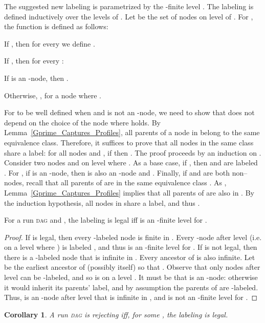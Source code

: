 \documentclass{LMCS}
\newcommand{\DAG}{\textsc{dag}\xspace}
\newtheorem{corollary}[theorem]{Corollary}
\begin{document}
The suggested new labeling is parametrized by the -finite level .  The labeling 
is defined inductively over the levels of .  Let  be the set of nodes on level  of .
For , the function  is defined as follows:
\begin{iteMize}{}
\item If , then for every  we define .
\item If , then for every :
\begin{iteMize}{}
\item If  is an -node, then .
\item Otherwise, , for a node  where . 
\end{iteMize}
\end{iteMize}
For  to be well defined when  and  is not an -node, we need to show that
 does not depend on the choice of the node  where  holds. By
Lemma~\ref{Gprime_Captures_Profiles}, all parents of a node in  belong to the same
equivalence class. Therefore, it suffices to prove that all nodes in the same class share a label:
for all nodes  and , if  then .  The
proof proceeds by an induction on . 
Consider two nodes  and  on level  where . As a base case, if , then  and
 are labeled .  For , if  is an -node, then  is also an -node and
.  Finally, if  and  are both non--nodes, recall that all
parents of  are in the same equivalence class . As ,
Lemma~\ref{Gprime_Captures_Profiles} implies that all parents of  are also in . By the
induction hypothesis, all nodes in  share a label, and thus .

\begin{lem}\label{Slices_Make_Sense}
For a run \DAG  and , the labeling  is legal iff  is an -finite
level for .
\end{lem}
\begin{proof}
If  is legal, then every -labeled node is finite in .  Every -node
after level  (i.e. on a level  where ) is labeled , and thus  is an -finite level for .  If  is
not legal, then there is a -labeled node  that is infinite in . Every
ancestor of  is also infinite.  Let  be the earliest ancestor of  
(possibly  itself) so
that . Observe that only nodes after level  can be -labeled, and so
 is on a level . It must be that  is an -node: otherwise it would inherit its
parents' label, and by assumption the parents of  are -labeled. Thus,  is an
-node after level  that is infinite in , and  is not an -finite level for
.
\end{proof}

\begin{corollary}\label{Slices_Complement}
A run \DAG  is rejecting iff, for some , the labeling  is legal.
\end{corollary}
\end{document}
